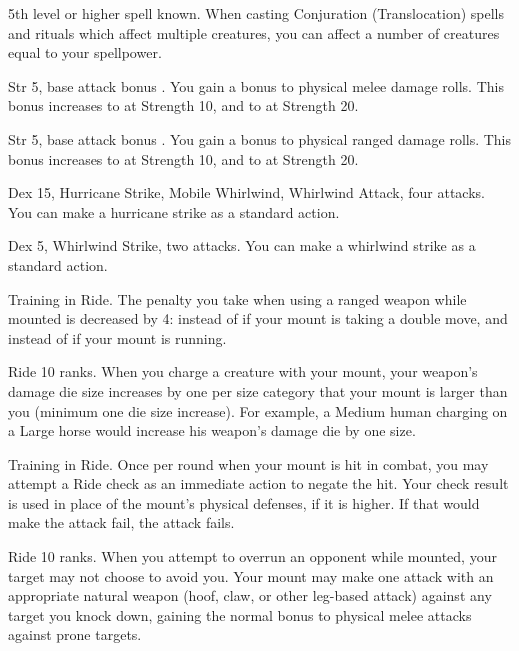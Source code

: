 \featpre 5th level or higher  spell known.
\featben When casting Conjuration (Translocation) spells and rituals which affect multiple creatures, you can affect a number of creatures equal to your spellpower.

\featpres Str 5, base attack bonus .
\featben You gain a  bonus to physical melee damage rolls.
This bonus increases to  at Strength 10, and to  at Strength 20.

\featpres Str 5, base attack bonus .
\featben You gain a  bonus to physical ranged damage rolls.
This bonus increases to  at Strength 10, and to  at Strength 20.

\featpres Dex 15, Hurricane Strike, Mobile Whirlwind, Whirlwind Attack, four attacks.
\featben You can make a hurricane strike as a standard action.

\featpres Dex 5, Whirlwind Strike, two attacks.
\featben You can make a whirlwind strike as a standard action.

\featpre Training in Ride.
\featben The penalty you take when using a ranged weapon while mounted is decreased by 4:  instead of  if your mount is taking a double move, and  instead of  if your mount is running.

\featpre Ride 10 ranks.
\featben When you charge a creature with your mount, your weapon's damage die size increases by one per size category that your mount is larger than you (minimum one die size increase).
For example, a Medium human charging on a Large horse would increase his weapon's damage die by one size.

\featpre Training in Ride.
\featben Once per round when your mount is hit in combat, you may attempt a Ride check as an immediate action to negate the hit.
Your check result is used in place of the mount's physical defenses, if it is higher.
If that would make the attack fail, the attack fails.

\featpre Ride 10 ranks.
\featben When you attempt to overrun an opponent while mounted, your target may not choose to avoid you.
Your mount may make one attack with an appropriate natural weapon (hoof, claw, or other leg-based attack) against any target you knock down, gaining the normal  bonus to physical melee attacks against prone targets.

